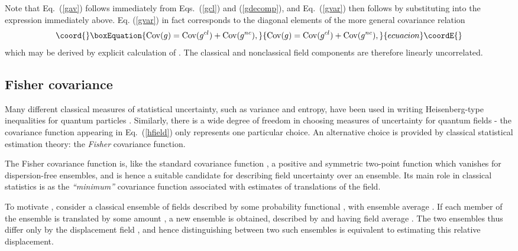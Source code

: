 \documentclass[a4paper,preprint, showpacs, aps, draft]{revtex4}
\begin{document}
{Note that Eq.~(\ref{gav}) follows immediately
from Eqs.~(\ref{gcl}) and (\ref{gdecomp}), and Eq.~(\ref{gvar}) then
follows by substituting \coordHE{} into the expression 
immediately above.  Eq. (\ref{gvar}) in fact corresponds to the diagonal
elements of the more general covariance relation
\begin{equation}\coord{}\boxEquation{ \label{covadd}
{\rm Cov}(g) = {\rm Cov}(g^{cl}) + {\rm Cov}(g^{nc}) ,
}{ {\rm Cov}(g) = {\rm Cov}(g^{cl}) + {\rm Cov}(g^{nc}) ,
}{ecuacion}\coordE{}\end{equation}
which may be derived by explicit calculation of \coordHE{}.  The
classical and nonclassical field components are therefore linearly uncorrelated. 

\subsection{Fisher covariance}
Many different classical measures of statistical
uncertainty, such as variance and entropy, have been used in writing
Heisenberg-type inequalities for quantum particles \cite{uffink}. 
Similarly, there is a wide degree of freedom in choosing measures of
uncertainty for quantum fields - the covariance function \coordHE{} appearing in Eq.~(\ref{hfield}) only represents one particular choice.
An alternative choice is provided by classical statistical
estimation theory:  the {\it Fisher} covariance function.

The Fisher covariance function \coordHE{} is, like the standard
covariance function \coordHE{}, a positive and symmetric two-point 
function which vanishes for dispersion-free ensembles, and is hence a
suitable candidate for describing field uncertainty over an ensemble.
Its main role in classical statistics is as the {\it ``minimum''} covariance
function associated with estimates of translations of the field.

To motivate \coordHE{}, consider a classical ensemble of fields
described by some probability functional \coordHE{}, with ensemble average \coordHE{}.  If each member of the
ensemble is translated by some amount \coordHE{}, a new ensemble is
obtained, described by \coordHE{} and having field average
\coordHE{}.  The two ensembles thus
differ only by the displacement field \coordHE{}, and hence
distinguishing between two such ensembles is equivalent to estimating
this relative displacement.

}
\end{document}
